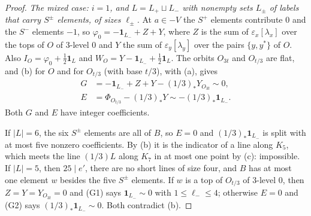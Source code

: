 \begin{proof}
\emph{The mixed case: $i=1$, and $L=L_{+}\sqcup L_{-}$ with nonempty sets
$L_{\pm}$ of labels that carry $S^{\pm}$ elements, of sizes $\ell_{\pm}$.} At
$a\in-V$ the $S^{+}$ elements contribute $0$ and the $S^{-}$ elements $-1$, so
$\varphi_{0}=-\mathbf 1_{L_{-}}+Z+Y$, where $Z$ is the sum of
$\varepsilon_{x}[\lambda_{x}]$ over the tops of $O$ of $3$-level $0$ and $Y$
the sum of $\varepsilon_{y}[\lambda_{y}]$ over the pairs $\{y,y^{*}\}$ of
$O$. Also $I_{O}=\varphi_{0}+\frac12\mathbf 1_{L}$ and $W_{O}=Y-\mathbf
1_{L_{-}}+\frac12\mathbf 1_{L}$. The orbits $O_{3t}$ and $O_{t/3}$ are flat,
and (b) for $O$ and for $O_{t/3}$ (with base $t/3$), with
(a), gives
\begin{align}
  G&=-\mathbf 1_{L_{-}}+Z+Y-(1/3)_{*}Y_{O_{3t}}\sim0,\tag{G1}\\
  E&=\Phi_{O_{t/3}}-(1/3)_{*}Y\sim-(1/3)_{*}\mathbf 1_{L_{-}}.\tag{G2}
\end{align}
Both $G$ and $E$ have integer coefficients.

If $|L|=6$, the six $S^{\pm}$ elements are all of $B$, so $E=0$ and
$(1/3)_{*}\mathbf 1_{L_{-}}$ is split with at most five nonzero coefficients.
By (b) it is the indicator of a line along $K_{5}$, which
meets the line $(1/3)L$ along $K_{7}$ in at most one point by
(c): impossible. If $|L|=5$, then $25\mid e'$, there are
no short lines of size four, and $B$ has at most one element $w$ besides the
five $S^{\pm}$ elements. If $w$ is a top of $O_{t/3}$ of $3$-level $0$, then
$Z=Y=Y_{O_{3t}}=0$ and (G1) says $\mathbf 1_{L_{-}}\sim0$ with
$1\le\ell_{-}\le4$; otherwise $E=0$ and (G2) says $(1/3)_{*}\mathbf
1_{L_{-}}\sim0$. Both contradict (b).


\end{proof}
